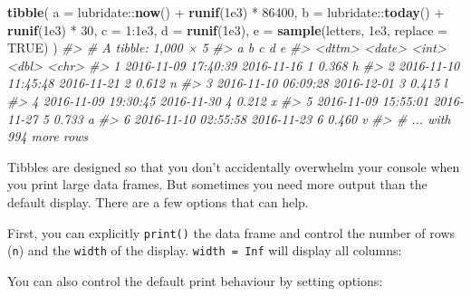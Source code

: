 \documentclass[]{book}
\newenvironment{Shaded}{\begin{snugshade}}{\end{snugshade}}
\newcommand{\KeywordTok}[1]{\textcolor[rgb]{0.13,0.29,0.53}{\textbf{{#1}}}}
\newcommand{\DataTypeTok}[1]{\textcolor[rgb]{0.13,0.29,0.53}{{#1}}}
\newcommand{\DecValTok}[1]{\textcolor[rgb]{0.00,0.00,0.81}{{#1}}}
\newcommand{\FloatTok}[1]{\textcolor[rgb]{0.00,0.00,0.81}{{#1}}}
\newcommand{\StringTok}[1]{\textcolor[rgb]{0.31,0.60,0.02}{{#1}}}
\newcommand{\CommentTok}[1]{\textcolor[rgb]{0.56,0.35,0.01}{\textit{{#1}}}}
\newcommand{\OtherTok}[1]{\textcolor[rgb]{0.56,0.35,0.01}{{#1}}}
\newcommand{\NormalTok}[1]{{#1}}
\begin{document}
\begin{Shaded}
\begin{Highlighting}[]
\KeywordTok{tibble}\NormalTok{(}
  \DataTypeTok{a =} \NormalTok{lubridate::}\KeywordTok{now}\NormalTok{() +}\StringTok{ }\KeywordTok{runif}\NormalTok{(}\FloatTok{1e3}\NormalTok{) *}\StringTok{ }\DecValTok{86400}\NormalTok{,}
  \DataTypeTok{b =} \NormalTok{lubridate::}\KeywordTok{today}\NormalTok{() +}\StringTok{ }\KeywordTok{runif}\NormalTok{(}\FloatTok{1e3}\NormalTok{) *}\StringTok{ }\DecValTok{30}\NormalTok{,}
  \DataTypeTok{c =} \DecValTok{1}\NormalTok{:}\FloatTok{1e3}\NormalTok{,}
  \DataTypeTok{d =} \KeywordTok{runif}\NormalTok{(}\FloatTok{1e3}\NormalTok{),}
  \DataTypeTok{e =} \KeywordTok{sample}\NormalTok{(letters, }\FloatTok{1e3}\NormalTok{, }\DataTypeTok{replace =} \OtherTok{TRUE}\NormalTok{)}
\NormalTok{)}
\CommentTok{#> # A tibble: 1,000 × 5}
\CommentTok{#>                     a          b     c     d     e}
\CommentTok{#>                <dttm>     <date> <int> <dbl> <chr>}
\CommentTok{#> 1 2016-11-09 17:40:39 2016-11-16     1 0.368     h}
\CommentTok{#> 2 2016-11-10 11:45:48 2016-11-21     2 0.612     n}
\CommentTok{#> 3 2016-11-10 06:09:28 2016-12-01     3 0.415     l}
\CommentTok{#> 4 2016-11-09 19:30:45 2016-11-30     4 0.212     x}
\CommentTok{#> 5 2016-11-09 15:55:01 2016-11-27     5 0.733     a}
\CommentTok{#> 6 2016-11-10 02:55:58 2016-11-23     6 0.460     v}
\CommentTok{#> # ... with 994 more rows}
\end{Highlighting}
\end{Shaded}

Tibbles are designed so that you don't accidentally overwhelm your
console when you print large data frames. But sometimes you need more
output than the default display. There are a few options that can help.

First, you can explicitly \texttt{print()} the data frame and control
the number of rows (\texttt{n}) and the \texttt{width} of the display.
\texttt{width\ =\ Inf} will display all columns:

\begin{Shaded}
\end{Shaded}

You can also control the default print behaviour by setting options:
\end{document}
